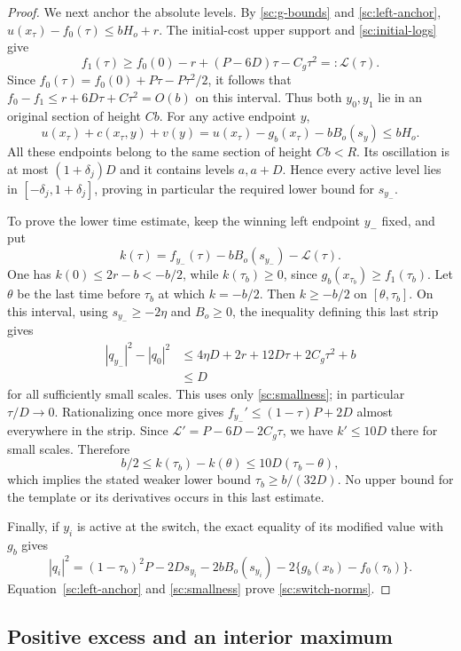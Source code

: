 \begin{proof}
We next anchor the absolute levels.  By \eqref{sc:g-bounds} and
\eqref{sc:left-anchor},
$u(x_\tau)-f_0(\tau)\leq bH_o+r$.
The initial-cost upper support and \eqref{sc:initial-logs} give
\begin{equation}
 f_1(\tau)\geq
 f_0(0)-r+(P-6D)\tau-C_g\tau^2=:\mathcal L(\tau).
 \label{sc:benchmark}
\end{equation}
Since $f_0(\tau)=f_0(0)+P\tau-P\tau^2/2$, it follows that
$f_0-f_1\leq r+6D\tau+C\tau^2=O(b)$ on this interval.
Thus both $y_0,y_1$ lie in an original section of height $Cb$.
For any active endpoint $y$,
\[
 u(x_\tau)+c(x_\tau,y)+v(y)
      =u(x_\tau)-g_b(x_\tau)-bB_o(s_y)\leq bH_o.
\]
All these endpoints belong to the same section of height $Cb<R$.
Its oscillation is at most $(1+\delta_j)D$ and it contains levels
$a,a+D$.  Hence every active level lies in
$[-\delta_j,1+\delta_j]$, proving in particular the required lower
bound for $s_{y_-}$.

To prove the lower time estimate, keep the winning left endpoint
$y_-$ fixed, and put
\[
 k(\tau)=f_{y_-}(\tau)-bB_o(s_{y_-})-\mathcal L(\tau).
\]
One has $k(0)\leq2r-b<-b/2$, while
$k(\tau_b)\geq0$, since $g_b(x_{\tau_b})\geq f_1(\tau_b)$.
Let $\theta$ be the last time before $\tau_b$ at which $k=-b/2$.
Then $k\geq-b/2$ on $[\theta,\tau_b]$.
On this interval, using $s_{y_-}\geq-2\eta$ and $B_o\geq0$, the
inequality defining this last strip gives
\begin{align*}
 |q_{y_-}|^2-|q_0|^2
 &\leq4\eta D+2r+12D\tau+2C_g\tau^2+b\\
 &\leq D
\end{align*}
for all sufficiently small scales.  This uses only
\eqref{sc:smallness}; in particular $\tau/D\to0$.
Rationalizing once more gives
$f_{y_-}'\leq(1-\tau)P+2D$ almost everywhere in the strip.
Since $\mathcal L'=P-6D-2C_g\tau$, we have $k'\leq10D$ there
for small scales.  Therefore
\[
 b/2\leq k(\tau_b)-k(\theta)\leq10D(\tau_b-\theta),
\]
which implies the stated weaker lower bound $\tau_b\geq b/(32D)$.
No upper bound for the template or its derivatives occurs in this
last estimate.

Finally, if $y_i$ is active at the switch, the exact equality of its
modified value with $g_b$ gives
\[
 |q_i|^2=(1-\tau_b)^2P-2Ds_{y_i}
         -2bB_o(s_{y_i})-2\{g_b(x_b)-f_0(\tau_b)\}.
\]
Equation~\eqref{sc:left-anchor} and \eqref{sc:smallness} prove
\eqref{sc:switch-norms}.
\end{proof}

\subsection{Positive excess and an interior maximum}

